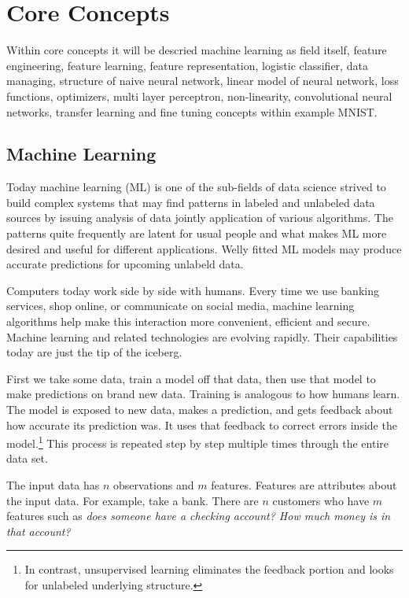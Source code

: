 \section{Core Concepts}
Within core concepts it will be descried machine learning as field itself, feature engineering, feature learning, feature representation, logistic classifier, data managing, structure of naive neural network, linear model of neural network, loss functions, optimizers, multi layer perceptron, non-linearity, convolutional neural networks, transfer learning and fine tuning concepts within example MNIST. %

\subsection{Machine Learning}
Today machine learning (ML) is one of the sub-fields of data science strived to build complex systems that may find patterns in labeled and unlabeled data sources by issuing analysis of data jointly application of various algorithms. The patterns quite frequently are latent for usual people and what makes ML more desired and useful for different applications.  Welly fitted  ML models may produce accurate predictions for upcoming unlabeld data.



Computers today work side by side with humans. Every time we use banking services, shop online, or communicate on social media, machine learning algorithms help make this interaction more convenient, efficient and secure. Machine learning and related technologies are evolving rapidly. Their capabilities today are just the tip of the iceberg.

First we take some data, train a model off that data, then use that model to make predictions on brand new data.  Training is analogous to how humans learn.  The model is exposed to new data, makes a prediction, and gets feedback about how accurate its prediction was.  It uses that feedback to correct errors inside the model.\footnote{In contrast, unsupervised learning eliminates the feedback portion and looks for unlabeled underlying structure.} This process is repeated step by step multiple times through the entire data set. 

The input data has $n$ observations and $m$ features.  Features are attributes about the input data.  For example, take a bank.  There are $n$ customers who have $m$ features such as \textit{does someone have a checking account?  How much money is in that account?}    

